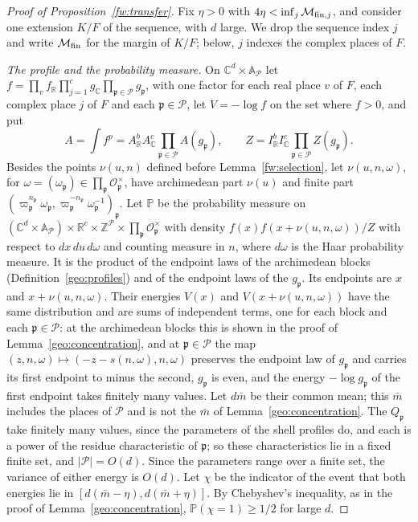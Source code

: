 \documentclass[11pt]{amsart}
\numberwithin{equation}{section}
\theoremstyle{definition}
\theoremstyle{remark}
\newcommand{\R}{\mathbb R}
\newcommand{\C}{\mathbb C}
\newcommand{\Z}{\mathbb Z}
\begin{document}
\begin{proof}[Proof of Proposition~\ref{fw:transfer}]
Fix $\eta>0$ with $4\eta<\inf_j\mathcal M_{{\rm fin},j}$, and consider
one extension $K/F$ of the sequence, with $d$ large. We drop the sequence
index $j$ and write $\mathcal M_{\rm fin}$ for the margin of $K/F$;
below, $j$ indexes the complex places of $F$.

\emph{The profile and the probability measure.} On $\C^d\times\mathbb
A_{\mathcal P}$ let
$f=\prod_vf_\R\prod_{j=1}^cg_\C\prod_{\mathfrak p\in\mathcal
P}g_{\mathfrak p}$, with one factor for each real place $v$ of $F$, each
complex place $j$ of $F$ and each $\mathfrak p\in\mathcal P$, let
$V=-\log f$ on the set where $f>0$, and put
\[
 A=\int f^p=A_\R^bA_\C^c\prod_{\mathfrak p\in\mathcal P}A(g_{\mathfrak p}),\qquad
 Z=I_\R^bI_\C^c\prod_{\mathfrak p\in\mathcal P}Z(g_{\mathfrak p}).
\]
Besides the points $\nu(u,n)$ defined before Lemma~\ref{fw:selection},
let $\nu(u,n,\omega)$, for $\omega=(\omega_{\mathfrak
p})\in\prod_{\mathfrak p}\mathcal O_{\mathfrak p}^\times$, have
archimedean part $\nu(u)$ and finite part $(\varpi_{\mathfrak
p}^{n_{\mathfrak p}}\omega_{\mathfrak p},\varpi_{\mathfrak
p}^{-n_{\mathfrak p}}\omega_{\mathfrak p}^{-1})_{\mathfrak p}$. Let
$\mathbb P$ be the probability measure on $(\C^d\times\mathbb
A_{\mathcal P})\times\R^c\times\Z^{\mathcal P}\times\prod_{\mathfrak
p}\mathcal O_{\mathfrak p}^\times$ with density
$f(x)f(x+\nu(u,n,\omega))/Z$ with respect to $dx\,du\,d\omega$ and
counting measure in $n$, where $d\omega$ is the Haar probability
measure. It is the product of the endpoint laws of the archimedean
blocks (Definition~\ref{geo:profiles}) and of the endpoint laws of the
$g_{\mathfrak p}$. Its endpoints are $x$ and $x+\nu(u,n,\omega)$. Their
energies $V(x)$ and $V(x+\nu(u,n,\omega))$ have the same distribution
and are sums of independent terms, one for each block and each
$\mathfrak p\in\mathcal P$: at the archimedean blocks this is shown in
the proof of Lemma~\ref{geo:concentration}, and at $\mathfrak
p\in\mathcal P$ the map $(z,n,\omega)\mapsto(-z-s(n,\omega),n,\omega)$
preserves the endpoint law of $g_{\mathfrak p}$ and carries its first
endpoint to minus the second, $g_{\mathfrak p}$ is even, and the energy
$-\log g_{\mathfrak p}$ of the first endpoint takes finitely many values.
Let $d\bar m$ be their common mean; this $\bar m$ includes the places of
$\mathcal P$ and is not the $\bar m$ of Lemma~\ref{geo:concentration}.
The $Q_{\mathfrak p}$ take finitely many values, since the parameters of
the shell profiles do, and each is a power of the residue characteristic
of $\mathfrak p$; so these characteristics lie in a fixed finite set,
and $|\mathcal P|=O(d)$. Since the parameters range over a finite set,
the variance of either energy is $O(d)$. Let $\chi$ be the indicator of
the event that both energies lie in $[d(\bar m-\eta),d(\bar m+\eta)]$.
By Chebyshev's inequality, as in the proof of
Lemma~\ref{geo:concentration}, $\mathbb P(\chi=1)\ge1/2$ for large $d$.


\end{proof}
\end{document}
